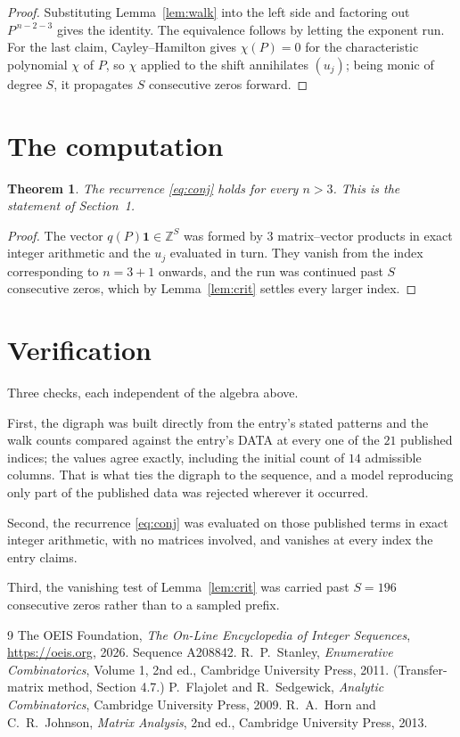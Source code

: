 \documentclass[11pt,a4paper]{article}
\theoremstyle{plain}
\newtheorem{theorem}{Theorem}
\theoremstyle{definition}
\begin{document}
\begin{proof}
Substituting Lemma~\ref{lem:walk} into the left side and factoring out
$P^{\,n-2-3}$ gives the identity. The equivalence follows by letting the exponent
run. For the last claim, Cayley--Hamilton gives $\chi(P)=0$ for the characteristic
polynomial $\chi$ of $P$, so $\chi$ applied to the shift annihilates $(u_j)$; being monic of
degree $S$, it propagates $S$ consecutive zeros forward.
\end{proof}

\section{The computation}

\begin{theorem}
The recurrence \eqref{eq:conj} holds for every $n>3$. This is the statement of
Section~1.
\end{theorem}

\begin{proof}
The vector $q(P)\mathbf{1}\in\mathbb{Z}^{S}$ was formed by $3$ matrix--vector
products in exact integer arithmetic and the $u_j$ evaluated in turn. They vanish from the
index corresponding to $n=3+1$ onwards, and the run was continued past $S$ consecutive
zeros, which by Lemma~\ref{lem:crit} settles every larger index.
\end{proof}

\section{Verification}

Three checks, each independent of the algebra above.

First, the digraph was built directly from the entry's stated patterns and the walk counts
compared against the entry's DATA at every one of the $21$ published indices; the
values agree exactly, including the initial count of $14$ admissible columns. That is
what ties the digraph to the sequence, and a model reproducing only part of the published
data was rejected wherever it occurred.

Second, the recurrence \eqref{eq:conj} was evaluated on those published terms in exact
integer arithmetic, with no matrices involved, and vanishes at every index the entry claims.

Third, the vanishing test of Lemma~\ref{lem:crit} was carried past $S=196$ consecutive
zeros rather than to a sampled prefix.

\begin{thebibliography}{9}
 The OEIS Foundation, \emph{The On-Line Encyclopedia of Integer
Sequences}, \url{https://oeis.org}, 2026. Sequence A208842.
 R.~P.~Stanley, \emph{Enumerative Combinatorics}, Volume 1, 2nd ed.,
Cambridge University Press, 2011. (Transfer-matrix method, Section 4.7.)
 P.~Flajolet and R.~Sedgewick, \emph{Analytic Combinatorics}, Cambridge
University Press, 2009.
 R.~A.~Horn and C.~R.~Johnson, \emph{Matrix Analysis}, 2nd ed., Cambridge
University Press, 2013.
\end{thebibliography}
\end{document}
